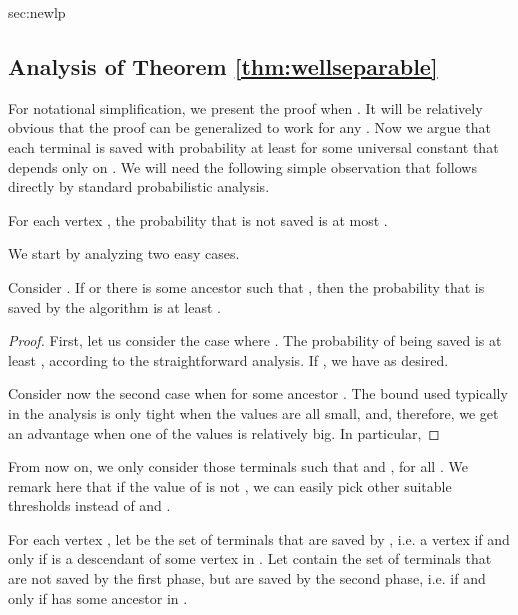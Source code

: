 \begin{appendixextra}{sec:newlp}{\subsection{Analysis of Theorem \ref{thm:wellseparable}}}

For notational simplification, we present the proof when . It will be relatively obvious that the proof can be generalized to work for any .  
Now we argue that each terminal  is saved with probability at least  for some universal constant  that depends only on . 
We will need the following simple observation that follows directly by standard probabilistic analysis. 


\begin{proposition}
\label{prop:LP-frac}  
For each vertex , the probability that  is not saved is at most . 
\end{proposition} 
 
We start by analyzing two easy cases.  

\begin{lemma} 
\label{newlp:specialcases}
Consider . If  or there is some ancestor  such that , then the probability that  is saved by the algorithm is at least .  
\end{lemma}  
\begin{proof} 
First, let us consider the case where . The probability of 
being saved is at least , according to the straightforward analysis.
If , we have  as desired. 

Consider now the second case when  for some ancestor . 
The bound used
typically in the analysis is only tight when the values are all small, and,
therefore, we get an advantage when one of the values is relatively big. In
particular,

\end{proof} 

From now on, we only consider those terminals  such that  and , for all . 
We remark here that if the value of  is not , we can easily pick other suitable thresholds instead of  and .  

For each vertex , let  be the set of terminals that are saved by , i.e. a vertex  if and only if  is a descendant of some vertex in .  
Let  contain the set of terminals that are not saved by the first phase, but are saved by the second phase, i.e.  if and only if  has some ancestor in .  


\newcommand{\avgsumgoodterm}[0]{\ensuremath{\sum_{i \in \lset_{t,2}}x_{v_{i,t}} x(\tilde L_{i,t})}}


\end{appendixextra}
